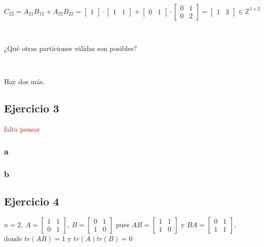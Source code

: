 \documentclass{article}
\begin{document}
\

$C_{22} = A_{21}B_{12} + A_{22}B_{22} =  
\begin{bmatrix}
    1
\end{bmatrix}
\cdot
\begin{bmatrix}
    1 & 1
\end{bmatrix}
+
\begin{bmatrix}
    0 & 1
\end{bmatrix}
\cdot
\begin{bmatrix}
    0 & 1 \\
    0 & 2
\end{bmatrix}
=
\begin{bmatrix}
    1 & 3
\end{bmatrix} \in \mathbb{Z}^{1\times 2}$

\

\noindent ¿Qué otras particiones válidas son posibles?

\

\noindent Hay dos más.

\subsection*{Ejercicio 3}


\textcolor{red}{falta pensar}

\subsubsection*{a}



\subsubsection*{b}

\subsection*{Ejercicio 4}

$n = 2, ~
A = \begin{bmatrix}
    1 & 1 \\
    0 & 1    
\end{bmatrix}, ~
B = \begin{bmatrix}
    0 & 1 \\
    1 & 0
\end{bmatrix}$ pues 
$AB = \begin{bmatrix}
    1 & 1 \\
    1 & 0
\end{bmatrix}$ y 
$BA = \begin{bmatrix}
    0 & 1 \\
    1 & 1
\end{bmatrix}$, donde $tr(AB) = 1$ y $tr(A)tr(B) = 0$
\end{document}
